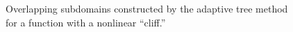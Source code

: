 \begin{figure}
  \centering
  \caption{Overlapping subdomains constructed by the adaptive tree method for a function with a nonlinear ``cliff.''}
  \label{TANFUN1}
\end{figure}

